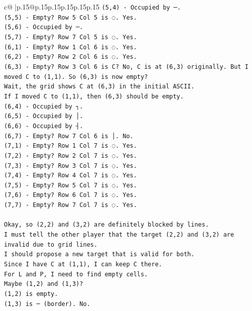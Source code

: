 \documentclass{article}
\begin{document}
{\begin{supertabular}{c@{$\;$}|p{.15\linewidth}@{}p{.15\linewidth}p{.15\linewidth}p{.15\linewidth}p{.15\linewidth}p{.15\linewidth}}
{{{\texttt{(5,4) {-} Occupied by ─.} \\
\texttt{(5,5) {-} Empty? Row 5 Col 5 is ◌. Yes.} \\
\texttt{(5,6) {-} Occupied by ─.} \\
\texttt{(5,7) {-} Empty? Row 7 Col 5 is ◌. Yes.} \\
\texttt{(6,1) {-} Empty? Row 1 Col 6 is ◌. Yes.} \\
\texttt{(6,2) {-} Empty? Row 2 Col 6 is ◌. Yes.} \\
\texttt{(6,3) {-} Empty? Row 3 Col 6 is C? No, C is at (6,3) originally. But I moved C to (1,1). So (6,3) is now empty?} \\
\texttt{Wait, the grid shows C at (6,3) in the initial ASCII.} \\
\texttt{If I moved C to (1,1), then (6,3) should be empty.} \\
\texttt{(6,4) {-} Occupied by ┐.} \\
\texttt{(6,5) {-} Occupied by │.} \\
\texttt{(6,6) {-} Occupied by ┤.} \\
\texttt{(6,7) {-} Empty? Row 7 Col 6 is │. No.} \\
\texttt{(7,1) {-} Empty? Row 1 Col 7 is ◌. Yes.} \\
\texttt{(7,2) {-} Empty? Row 2 Col 7 is ◌. Yes.} \\
\texttt{(7,3) {-} Empty? Row 3 Col 7 is ◌. Yes.} \\
\texttt{(7,4) {-} Empty? Row 4 Col 7 is ◌. Yes.} \\
\texttt{(7,5) {-} Empty? Row 5 Col 7 is ◌. Yes.} \\
\texttt{(7,6) {-} Empty? Row 6 Col 7 is ◌. Yes.} \\
\texttt{(7,7) {-} Empty? Row 7 Col 7 is ◌. Yes.} \\
\\ 
\texttt{Okay, so (2,2) and (3,2) are definitely blocked by lines.} \\
\texttt{I must tell the other player that the target (2,2) and (3,2) are invalid due to grid lines.} \\
\texttt{I should propose a new target that is valid for both.} \\
\texttt{Since I have C at (1,1), I can keep C there.} \\
\texttt{For L and P, I need to find empty cells.} \\
\texttt{Maybe (1,2) and (1,3)?} \\
\texttt{(1,2) is empty.} \\
\texttt{(1,3) is ─ (border). No.} \\
}}}
\end{supertabular}}
\end{document}
